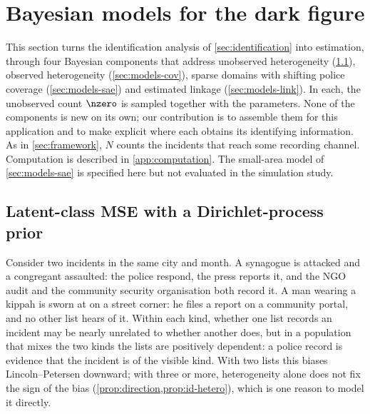 \section{Bayesian models for the dark figure}\label{sec:models}

This section turns the identification analysis of \cref{sec:identification} into estimation, through four Bayesian components that address unobserved heterogeneity (\cref{sec:models-lcmcr}), observed heterogeneity (\cref{sec:models-cov}), sparse domains with shifting police coverage (\cref{sec:models-sae}) and estimated linkage (\cref{sec:models-link}). In each, the unobserved count $\nzero$ is sampled together with the parameters. None of the components is new on its own; our contribution is to assemble them for this application and to make explicit where each obtains its identifying information. As in \cref{sec:framework}, $N$ counts the incidents that reach some recording channel. Computation is described in \cref{app:computation}. The small-area model of \cref{sec:models-sae} is specified here but not evaluated in the simulation study.

\subsection{Latent-class MSE with a Dirichlet-process prior}\label{sec:models-lcmcr}

Consider two incidents in the same city and month. A synagogue is attacked and a congregant assaulted: the police respond, the press reports it, and the NGO audit and the community security organisation both record it. A man wearing a kippah is sworn at on a street corner: he files a report on a community portal, and no other list hears of it. Within each kind, whether one list records an incident may be nearly unrelated to whether another does, but in a population that mixes the two kinds the lists are positively dependent: a police record is evidence that the incident is of the visible kind. With two lists this biases Lincoln--Petersen downward; with three or more, heterogeneity alone does not fix the sign of the bias (\cref{prop:direction,prop:id-hetero}), which is one reason to model it directly.

